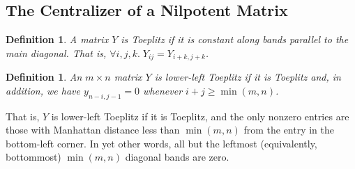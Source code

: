 \documentclass[12pt,psamsfonts]{article}
\newtheorem{definition}[theorem]{Definition}
\begin{document}
\subsection{The Centralizer of a Nilpotent Matrix}
\begin{definition}
    A matrix \(Y\) is \emph{Toeplitz} if it is constant along bands parallel to the main diagonal.
    That is, \(\forall i,j,k. \; Y_{ij} = Y_{i + k, j + k}\).
\end{definition}
\begin{definition}
    An \(m \times n\) matrix \(Y\) is \emph{lower-left Toeplitz} if it is Toeplitz and, in addition, we have \(y_{n - i, j - 1} = 0\) whenever \(i + j \geq \min(m,n)\).
\end{definition}
That is, \(Y\) is lower-left Toeplitz if it is Toeplitz, and the only nonzero entries are those with Manhattan distance less than \(\min(m,n)\) from the entry in the bottom-left corner.
In yet other words, all but the leftmost (equivalently, bottommost) \(\min(m,n)\) diagonal bands are zero.
\end{document}
